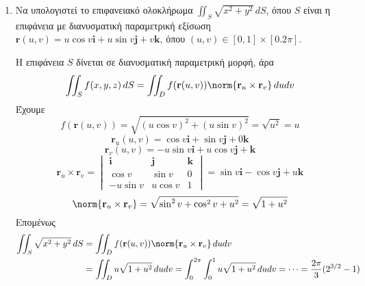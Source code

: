 \documentclass[a4paper,table]{report}
\begin{document}
\begin{center}
  \minibox{\bfseries\large \textcolor{Col1}{Ασκήσεις Επιφανειακό Ολοκλήρωμα (Ιου
  είδους)}} 
\end{center} 

\vspace{\baselineskip} 

\begin{enumerate}
  \item Να υπολογιστεί το επιφανειακό ολοκλήρωμα $ \iint_{S} \sqrt{x^{2}+y^{2}} \,{dS} $,
    όπου $ S $ είναι η επιφάνεια με διανυσματική παραμετρική εξίσωση $ \mathbf{r}(u,v) =
    u \cos{v}\mathbf{i}+ u \sin{v}\mathbf{j}+ v\mathbf{k} $, όπου $ (u,v) \in
    [0,1]\times[0.2 \pi] $. 
    \begin{solution}
      Η επιφάνεια $S$ δίνεται σε διανυσματική παραμετρική μορφή, άρα 
      \[
        \iint_{S} f(x,y,z) \,{dS} 
        = \iint_{D} f(\mathbf{r}(u,v)) \norm{\mathbf{r}_{u}\times \mathbf{r}_{v}} \, dudv
      \]
      Έχουμε
      \[
        f(\mathbf{r}(u,v)) = \sqrt{(u \cos{v} )^{2}+(u \sin{v} )^{2}} = \sqrt{u^{2}} = u 
      \] 
      \[
        \mathbf{r}_{u}(u,v) = \cos{v}\mathbf{i}+ \sin{v}\mathbf{j}+0\mathbf{k}
      \] 
      \[
        \mathbf{r}_{v}(u,v) = -u \sin{v}\mathbf{i}+u \cos{v}\mathbf{j}+\mathbf{k}  
      \] 
      \[
        \mathbf{r}_{u}\times \mathbf{r}_{v} = 
        \begin{vmatrix*}
          \mathbf{i} & \mathbf{j} & \mathbf{k} \\
          \cos{v} & \sin{v} & 0 \\
          -u \sin{v} & u \cos{v} & 1
        \end{vmatrix*} = \sin{v} \mathbf{i} - \cos{v} \mathbf{j} + u \mathbf{k}
      \]
      \[
        \norm{\mathbf{r}_{u}\times \mathbf{r}_{v}} = \sqrt{\sin^{2}{v} +
        \cos^{2}{v}+u^{2}} = \sqrt{1 + u^{2}} 
      \] 
      Επομένως
      \begin{align*}
        \iint_{S} \sqrt{x^{2}+y^{2}} \,{dS} 
        &= \iint_{D} f(\mathbf{r}(u,v)) \norm{\mathbf{r}_{u}\times \mathbf{r}_{v}} 
        \,{du} {dv} \\
        &= \iint_{D} u \sqrt{1+u^{2}} \,{du}{dv} = \int _{0}^{2 \pi} \int _{0}^{1} u
        \sqrt{1+u^{2}} \,{du} {dv} = \cdots = \frac{2 \pi}{3} (2^{3/2}-1)
      \end{align*}
    \end{solution}


\end{enumerate}
\end{document}
